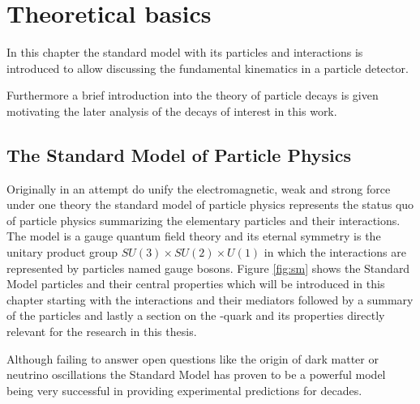 
\chapter{Theoretical basics}

In this chapter the standard model with its particles and interactions is introduced to allow discussing the fundamental kinematics in a particle detector.

Furthermore a brief introduction into the theory of particle decays is given motivating the later analysis of the decays of interest in this work.


\section{The Standard Model of Particle Physics}
\label{sec:sm}

Originally in an attempt do unify the electromagnetic, weak and strong force under one theory the standard model of particle physics represents the status quo of particle physics summarizing the elementary particles and their interactions.
The model is a gauge quantum field theory and its eternal symmetry is the unitary product group $SU(3) \times SU(2) \times U(1)$ in which the interactions are represented by particles named gauge bosons.
Figure \ref{fig:sm} shows the Standard Model particles and their central properties which will be introduced in this chapter starting with the interactions and their mediators followed by a summary of the particles and lastly a section on the \Ptop-quark and its properties directly relevant for the research in this thesis.

Although failing to answer open questions like the origin of dark matter or neutrino oscillations the Standard Model has proven to be a powerful model being very successful in providing experimental predictions for decades.

